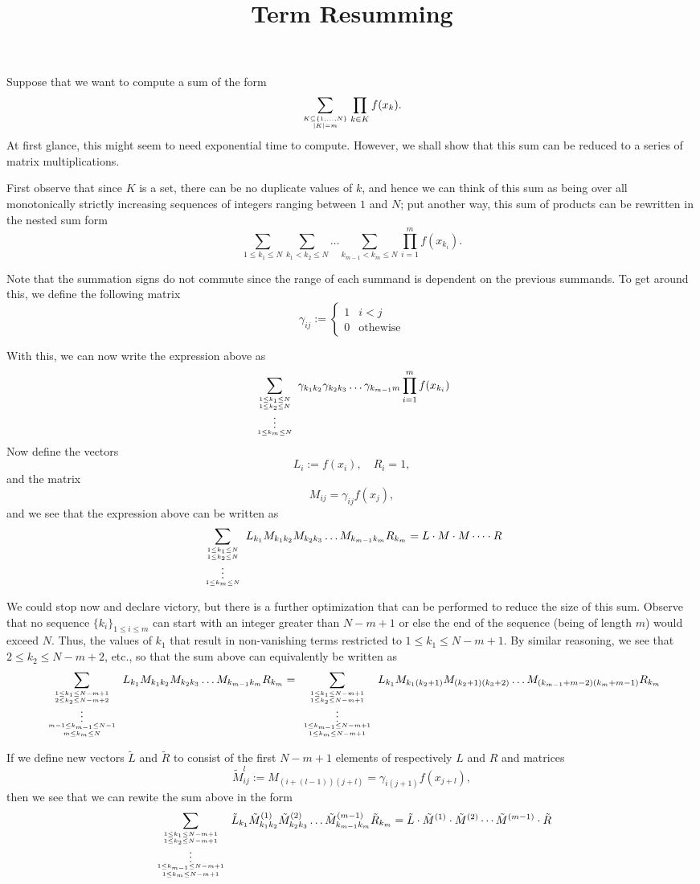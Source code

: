 \documentclass[onecolumn,amsmath,amssymb,nofootinbib,floatfix]{revtex4}
\title{Term Resumming}
\begin{document}
Suppose that we want to compute a sum of the form
$$\sum_{K\subseteq \{1,\dots,N\}\atop |K|=m} \prod_{k\in K} f(x_k).$$
At first glance, this might seem to need exponential time to compute.  However, we shall show that this sum can be reduced to a series of matrix multiplications.

First observe that since $K$ is a set, there can be no duplicate values of $k$, and hence we can think of this sum as being over all monotonically strictly increasing sequences of integers ranging between $1$ and $N$;  put another way, this sum of products can be rewritten in the nested sum form
$$\sum_{1 \le k_1 \le N} \sum_{k_1 < k_2 \le N} \dots \sum_{k_{m-1} < k_m \le N} \prod_{i=1}^m f(x_{k_i}).$$

Note that the summation signs do not commute since the range of each summand is dependent on the previous summands.  To get around this, we define the following matrix
$$\gamma_{ij}:=
\begin{cases}
1 & i < j \\
0 & \text{othewise}
\end{cases}
$$

With this, we can now write the expression above as
$$
\sum_{
1\le k_1\le N \atop {
1\le k_2\le N \atop {
\vdots \atop {
1\le k_m\le N
}}}}
\gamma_{k_1k_2}\gamma_{k_2k_3}\dots\gamma_{k_{m-1}m}
\prod_{i=1}^m f(x_{k_i})
$$
Now define the vectors
$$L_i := f(x_i), \quad R_i = 1,$$
and the matrix
$$M_{ij} = \gamma_{ij}f(x_j),$$
and we see that the expression above can be written as
$$
\sum_{
1\le k_1\le N \atop {
1\le k_2\le N \atop {
\vdots \atop {
1\le k_m\le N
}}}}
L_{k_1}M_{k_1k_2}M_{k_2k_3}\dots M_{k_{m-1}k_m} R_{k_m} = L\cdot M \cdot M \cdots \cdot R
$$

We could stop now and declare victory, but there is a further optimization that can be performed to reduce the size of this sum.  Observe that no sequence $\{k_i\}_{1\le i\le m}$ can start with an integer greater than $N-m+1$ or else the end of the sequence (being of length $m$) would exceed $N$.  Thus, the values of $k_1$ that result in non-vanishing terms restricted to $1\le k_1\le N-m+1$.  By similar reasoning, we see that $2\le k_2 \le N-m+2$, etc., so that the sum above can equivalently be written as
$$
\sum_{
1\le k_1\le N-m+1 \atop {
2\le k_2\le N-m+2 \atop {
\vdots \atop {
m-1\le k_{m-1}\le N-1 \atop {
m\le k_m\le N
}}}}}
L_{k_1}M_{k_1k_2}M_{k_2k_3}\dots M_{k_{m-1}k_m} R_{k_m}
=\sum_{
1\le k_1\le N-m+1 \atop {
1\le k_2\le N-m+1 \atop {
\vdots \atop {
1\le k_{m-1}\le N-m+1 \atop {
1\le k_m\le N-m+1
}}}}}
L_{k_1}M_{k_1(k_2+1)}M_{(k_2+1)(k_3+2)}\dots M_{(k_{m-1}+m-2)(k_m+m-1)} R_{k_m}
$$

If we define new vectors $\tilde L$ and $\tilde R$ to consist of the first $N-m+1$ elements of respectively $L$ and $R$ and matrices
$$
\tilde M^{l}_{ij} := M_{(i+(l-1))(j+l)}= \gamma_{i(j+1)}f(x_{j+l}),
$$
then we see that we can rewite the sum above in the form
$$
\sum_{
1\le k_1\le N-m+1 \atop {
1\le k_2\le N-m+1 \atop {
\vdots \atop {
1\le k_{m-1}\le N-m+1 \atop {
1\le k_m\le N-m+1
}}}}}
\tilde L_{k_1}\tilde M^{(1)}_{k_1k_2}\tilde M^{(2)}_{k_2k_3}\dots \tilde M^{(m-1)}_{k_{m-1}k_m} \tilde R_{k_m}
=\tilde L \cdot \tilde M^{(1)}\cdot \tilde M^{(2)} \cdots \tilde M^{(m-1)}\cdot \tilde R
$$
\end{document}

